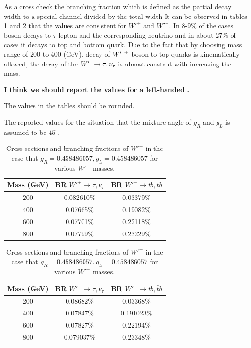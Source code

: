 As a cross check the branching fraction which is defined as the partial decay width to a special channel divided by the total width
It can be observed in tables \ref{tab:W'Plus} and \ref{tab:W'Minus} that the values are consistent for $W'^+$ and $W'^-$. In 8-9\% of the cases \wprime boson decays to $\tau$ lepton and the corresponding neutrino and in about 27\% of cases it decays to top and  bottom quark. Due to the fact that by choosing mass range of 200 to 400 (GeV), decay of $ W^\prime~^\pm $ boson to top quarks is kinematically allowed, the decay of the $ W^\prime~\rightarrow \tau,\nu_\tau $ is almost constant with increasing the \wprime mass.
{\bf I think we should report the values for a left-handed \wprime.
	
	The values in the tables should be rounded.
	
	The reported values for the situation that the mixture angle of $ g_R$ and  $g_L$ is assumed to be $45^\circ $. }
\begin{table}[htb]
	\centering
	\begin{tabular}{|c|c|c|}
		\hline 
		\wprime Mass (GeV)  &  BR $ W'^+\rightarrow \tau,\nu_\tau $& BR $ W'^+\rightarrow  t \bar{b},\bar{t}b $ \\
		\hline 
		200 & 0.082610\% & 0.03379\%\\
		400 &0.07665\%& 0.19082\%\\
		600 &0.07701\%&0.22118\%\\
		800&0.07799\% &0.23229\%\\
		\hline
	\end{tabular}
	\caption{Cross sections and branching fractions of $W'^+$ in the case that $ g_R=0.458486057 , g_L=0.458486057  $ for various $W'^+$ masses. \label{tab:W'Plus} }
\end{table}
\begin{table}[htb]
	\centering
	\begin{tabular}{|c|c|c|}
		\hline 
		\wprime Mass (GeV)  &  BR $ W'^-\rightarrow \tau,\nu_\tau $ & BR $ W'^-\rightarrow  t \bar{b},\bar{t}b $ \\
		\hline 
		200 &  0.08682\% &0.03368\% \\
		400  &0.07847\% &0.191023\% \\
		600  &0.07827\%&0.22194\%\\
		800  &0.079037\% &0.23348\% \\
		\hline
	\end{tabular}
	\caption{Cross sections and branching fractions of $W'^-$ in the case that $ g_R=0.458486057 , g_L=0.458486057  $ for various $W'^-$ masses. \label{tab:W'Minus} }
\end{table}


